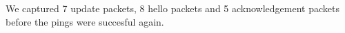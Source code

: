 We captured 7 update packets, 8 hello packets and 5 acknowledgement packets before the pings were succesful again.